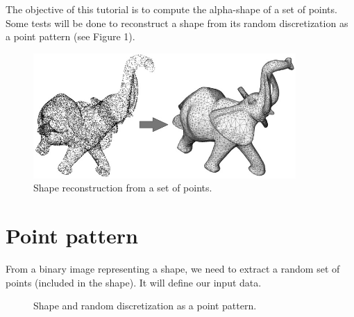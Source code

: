 \def\difficulty{1}
\label{tut:alphashapes:enonce}

\begin{note}
The objective of this tutorial is to compute the alpha-shape of a set of points. Some tests will be done to reconstruct a shape from its random discretization as a point pattern (see Figure 1).
\end{note}


\begin{figure}[htbp]
\centering
\includegraphics[width=10cm]{elephant.png}
 \caption{Shape reconstruction from a set of points.}
 \label{fig:alphashapes:elephant}
\end{figure}


\section{Point pattern}

From a binary image representing a shape, we need to extract a random set of points (included in the shape). It will define our input data.
\begin{figure}[htbp]
\centering
{}\hspace{.5cm}
\hspace{.5cm}
\caption{Shape and random discretization as a point pattern.}
\label{fig:alphashapes:pp}
\end{figure}

